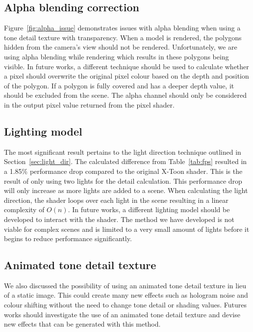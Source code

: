 \documentclass[annual]{acmsiggraph}
\begin{document}
\subsection{Alpha blending correction}
Figure~\ref{fig:alpha_issue} demonstrates issues with alpha blending when using a tone detail texture with transparency. When a model is rendered, the polygons hidden from the camera's view should not be rendered. Unfortunately, we are using alpha blending while rendering which results in these polygons being visible. In future works, a different technique should be used to calculate whether a pixel should overwrite the original pixel colour based on the depth and position of the polygon. If a polygon is fully covered and has a deeper depth value, it should be excluded from the scene. The alpha channel should only be considered in the output pixel value returned from the pixel shader.

\subsection{Lighting model}
The most significant result pertains to the light direction technique outlined in Section~\ref{sec:light_dir}. The calculated difference from Table~\ref{tab:fps} resulted in a 1.85\% performance drop compared to the original X-Toon shader. This is the result of only using two lights for the detail calculation. This performance drop will only increase as more lights are added to a scene. When calculating the light direction, the shader loops over each light in the scene resulting in a linear complexity of $O(n)$. In future works, a different lighting model should be developed to interact with the shader. The method we have developed is not viable for complex scenes and is limited to a very small amount of lights before it begins to reduce performance significantly. 

\subsection{Animated tone detail texture}
We also discussed the possibility of using an animated tone detail texture in lieu of a static image. This could create many new effects such as hologram noise and colour shifting without the need to change tone detail or shading values. Futures works should investigate the use of an animated tone detail texture and devise new effects that can be generated with this method.
\end{document}
